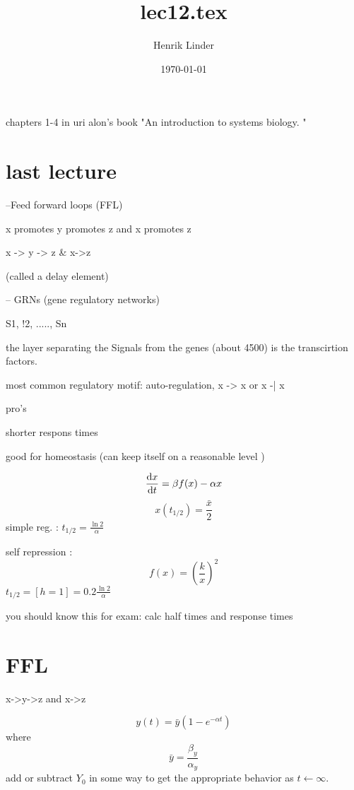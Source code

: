 \documentclass{article}
\title{lec12.tex }
\author{Henrik Linder}
\date{\today}
\begin{document}
\maketitle


chapters 1-4 in uri alon's book "An introduction to systems biology. "

\section{last lecture}
--Feed forward loops (FFL)

x promotes y promotes z and x promotes z

x -> y -> z \& x->z

(called a delay element)

-- GRNs (gene regulatory networks)

S1, !2, ....., Sn

the layer separating the Signals from the genes (about 4500) is the transcirtion factors. 





most common regulatory motif: auto-regulation, x -> x or x -| x

pro's

shorter respons times 

good for homeostasis (can keep itself on a reasonable level )

\begin{equation}
	\dv{x}{t} = \beta f(x) - \alpha x
\end{equation}
\begin{equation}
	x(t_{1/2}) = \frac{\bar x}{2}
\end{equation}
simple reg. : $t_{1/2}= \frac{\ln 2}{\alpha}$ 

self repression : 
\begin{equation}
	f(x) = \left(\frac{k}{x}\right) ^2
\end{equation}
$t_{1/2} = [h = 1] = 0.2 \frac{\ln2}{\alpha}$

you should know this for exam: calc half times and response times




\section{FFL}
x->y->z and x->z


\begin{equation}
	y(t) = \bar y (1-e^{-\alpha t})
\end{equation}
where 
\begin{equation}
	\bar y = \frac{\beta_y}{\alpha _y}
\end{equation}
add or subtract $Y_0$ in some way to get the appropriate behavior as $t\leftarrow \infty$. 
\end{document}
